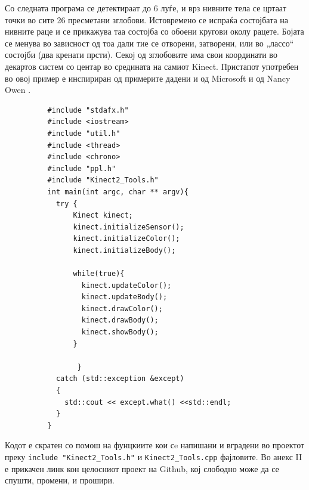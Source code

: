 \documentclass[11pt]{article}
\begin{document}
    Со следната програма се детектираат до 6 луѓе, и врз нивните тела се цртаат точки во сите 26 пресметани зглобови. Истовремено се испраќа состојбата на нивните раце и се прикажува таа состојба со обоени кругови околу рацете. Бојата се менува во зависност од тоа дали тие се отворени, затворени, или во „лассо“ состојби (два кренати прсти). Секој од зглобовите има свои координати во декартов систем со центар во средината на самиот Kinect. Пристапот употребен во овој пример е инспириран од примерите дадени и од Microsoft и од Nancy Owen \cite{nancyowen}.
    \begin{verbatim}
          #include "stdafx.h"
          #include <iostream>
          #include "util.h"
          #include <thread>
          #include <chrono>
          #include "ppl.h"
          #include "Kinect2_Tools.h"
          int main(int argc, char ** argv){
            try {
                Kinect kinect;
                kinect.initializeSensor();
                kinect.initializeColor();
                kinect.initializeBody();

                while(true){
                  kinect.updateColor();
                  kinect.updateBody();
                  kinect.drawColor();
                  kinect.drawBody();
                  kinect.showBody();
                }

                 }
            catch (std::exception &except)
            {
              std::cout << except.what() <<std::endl;
            }
          }
        \end{verbatim}

    Кодот е скратен со помош на фунцкиите кои сe напишани и вградени во проектот преку \verb+include "Kinect2_Tools.h"+ и \verb+Kinect2_Tools.cpp+ фајловите. Во анекс II е прикачен линк кон целосниот проект на Github, кој слободно може да се спушти, промени, и прошири.
\end{document}
